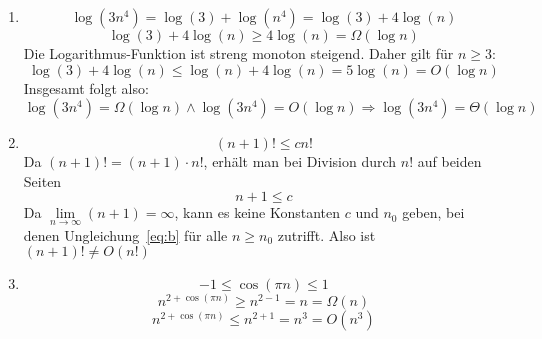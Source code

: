 \documentclass[11pt,a4paper]{article}
\begin{document}
\begin{loesung}
\begin{enumerate}
    \item
    \begin{equation}
        \log(3n^4) = \log(3) + \log(n^4) = \log(3) + 4\log(n)
    \end{equation}
    \begin{equation}
        \log(3) + 4\log(n)\geq 4\log(n) = \Omega(\log n) 
    \end{equation}
    Die Logarithmus-Funktion ist streng monoton steigend. Daher gilt für $n \geq 3$:
    \begin{equation}
        \log(3) + 4\log(n) \leq \log(n) + 4\log(n) = 5 \log(n) = O(\log n) 
    \end{equation}
    Insgesamt folgt also:
    \begin{equation}
        \log(3n^4) = \Omega(\log n) \wedge \log(3n^4) = O(\log n) \Rightarrow \log(3n^4) = \Theta(\log n)
    \end{equation}
    
    \item
    \begin{equation}
        (n + 1)! \leq c n!
    \end{equation}
    Da $(n + 1)! = (n + 1) \cdot n!$, erhält man bei Division durch $n!$ auf beiden Seiten
    \begin{equation}
        \label{eq:b}
        n + 1 \leq c
    \end{equation}
    Da $\lim\limits_{n \rightarrow \infty} (n + 1) = \infty$, kann es keine Konstanten $c$ und $n_0$ geben, bei denen Ungleichung~\ref{eq:b} für alle $n \geq n_0$ zutrifft.
    Also ist $(n + 1)! \neq O(n!)$



    \item
    \begin{equation}
        -1 \leq \cos(\pi n) \leq 1
    \end{equation}
    \begin{equation}
        n^{2 + \cos(\pi n)} \geq n^{2 - 1} = n = \Omega(n)
    \end{equation}
    \begin{equation}
        n^{2 + \cos(\pi n)} \leq n^{2 + 1} = n^3 = O(n^3)
    \end{equation}


\end{enumerate}
\end{loesung}
\end{document}
